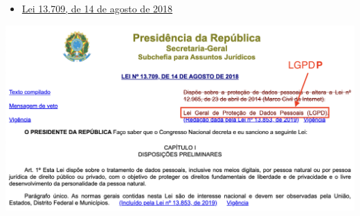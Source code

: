 \documentclass{beamer}\usepackage[]{graphicx}\usepackage[]{xcolor}
\begin{document}
\begin{frame}{\secname}
  \begin{itemize}
    \item \href{https://www.planalto.gov.br/ccivil_03/_ato2015-2018/2018/lei/l13709.htm}{Lei 13.709, de 14 de agosto de 2018}
	\end{itemize}
\bigskip
	\begin{center}
  \includegraphics[scale=0.3]{lgpdp.png}
  \end{center}
\end{frame}
\end{document}
